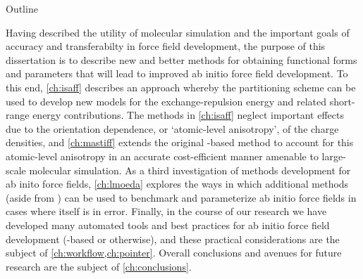 \begin{section}{Outline}

Having described the utility of
molecular simulation and 
the important goals of accuracy and transferabilty in force field development,
the purpose of this dissertation is to describe new and better methods for
obtaining functional forms and parameters that will lead to improved ab initio force
field development. To this end,
\cref{ch:isaff} describes an approach whereby the \isa partitioning scheme can
be used to develop new models 
for the \sapt exchange-repulsion energy and related
short-range energy contributions. The methods in \cref{ch:isaff} neglect
important effects due to the orientation dependence, or `atomic-level
anisotropy', of the \isa charge densities, and \cref{ch:mastiff} extends the
original \isa-based method to account for this atomic-level anisotropy in an
accurate cost-efficient
manner amenable to large-scale molecular simulation.
As a third investigation of methods development for ab inito
force fields, \cref{ch:lmoeda} explores the ways in which additional \eda
methods (aside from \sapt) can be used to benchmark and parameterize ab initio
force fields in cases where \sapt itself is in error. Finally, in the course
of our research we have developed many automated tools and best practices for ab initio force 
field development (\sapt-based or otherwise), and these practical
considerations are the subject of \cref{ch:workflow,ch:pointer}. Overall
conclusions and avenues for future research are the subject of
\cref{ch:conclusions}. 


\end{section}
